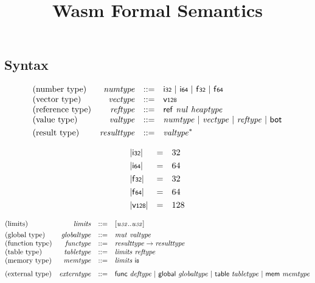 \documentclass[a4paper]{scrartcl}
\title{Wasm Formal Semantics}
\begin{document}
\small

\maketitle


\subsection*{Syntax}

$$
\begin{array}{@{}lrrl@{}l@{}}
\mbox{(number type)} & {\mathit{numtype}} &::=& \mathsf{i{\scriptstyle32}} ~|~ \mathsf{i{\scriptstyle64}} ~|~ \mathsf{f{\scriptstyle32}} ~|~ \mathsf{f{\scriptstyle64}} \\
\mbox{(vector type)} & {\mathit{vectype}} &::=& \mathsf{v{\scriptstyle128}} \\
\mbox{(reference type)} & {\mathit{reftype}} &::=& \mathsf{ref}~{\mathit{nul}}~{\mathit{heaptype}} \\
\mbox{(value type)} & {\mathit{valtype}} &::=& {\mathit{numtype}} ~|~ {\mathit{vectype}} ~|~ {\mathit{reftype}} ~|~ \mathsf{bot} \\[0.8ex]
\mbox{(result type)} & {\mathit{resulttype}} &::=& {{\mathit{valtype}}^\ast} \\
\end{array}
$$

$$
\begin{array}{@{}lcl@{}l@{}}
{|\mathsf{i{\scriptstyle32}}|} &=& 32 &  \\[0.8ex]
{|\mathsf{i{\scriptstyle64}}|} &=& 64 &  \\[0.8ex]
{|\mathsf{f{\scriptstyle32}}|} &=& 32 &  \\[0.8ex]
{|\mathsf{f{\scriptstyle64}}|} &=& 64 &  \\[0.8ex]
{|\mathsf{v{\scriptstyle128}}|} &=& 128 &  \\
\end{array}
$$

$$
\begin{array}{@{}lrrl@{}l@{}}
\mbox{(limits)} & {\mathit{limits}} &::=& [{\mathit{u{\scriptstyle32}}} .. {\mathit{u{\scriptstyle32}}}] \\[0.8ex]
\mbox{(global type)} & {\mathit{globaltype}} &::=& {\mathit{mut}}~{\mathit{valtype}} \\
\mbox{(function type)} & {\mathit{functype}} &::=& {\mathit{resulttype}} \rightarrow {\mathit{resulttype}} \\
\mbox{(table type)} & {\mathit{tabletype}} &::=& {\mathit{limits}}~{\mathit{reftype}} \\
\mbox{(memory type)} & {\mathit{memtype}} &::=& {\mathit{limits}}~\mathsf{i{\scriptstyle8}} \\[0.8ex]
{} \\[-2ex]
\mbox{(external type)} & {\mathit{externtype}} &::=& \mathsf{func}~{\mathit{deftype}} ~|~ \mathsf{global}~{\mathit{globaltype}} ~|~ \mathsf{table}~{\mathit{tabletype}} ~|~ \mathsf{mem}~{\mathit{memtype}} \\
\end{array}
$$
\end{document}
